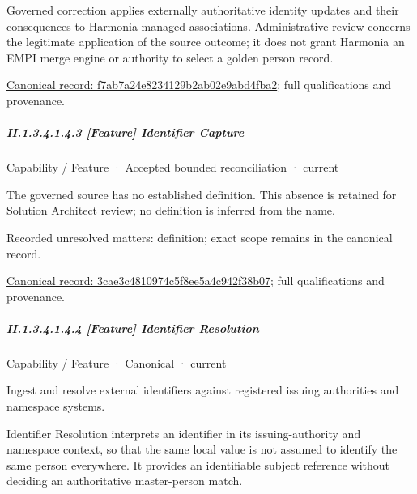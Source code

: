 Governed correction applies externally authoritative identity updates and their consequences to Harmonia-managed associations. Administrative review concerns the legitimate application of the source outcome; it does not grant Harmonia an EMPI merge engine or authority to select a golden person record.


{\footnotesize \href{../../../../continuum/strategy/capability/feature/f7ab7a24e8234129b2ab02e9abd4fba2.md}{Canonical record: f7ab7a24e8234129b2ab02e9abd4fba2}; full qualifications and provenance.}\par
\subparagraph*{II.1.3.4.1.4.3 [Feature] Identifier Capture}
\label{navigation:II.1.3.4.1.4.3}

\label{element:3cae3c4810974c5f8ee5a4c942f38b07}
{\small Capability / Feature · Accepted bounded reconciliation · current}\par

The governed source has no established definition. This absence is retained for Solution Architect review; no definition is inferred from the name.


{\small Recorded unresolved matters: definition; exact scope remains in the canonical record.}\par
{\footnotesize \href{../../../../continuum/strategy/capability/feature/3cae3c4810974c5f8ee5a4c942f38b07.md}{Canonical record: 3cae3c4810974c5f8ee5a4c942f38b07}; full qualifications and provenance.}\par
\subparagraph*{II.1.3.4.1.4.4 [Feature] Identifier Resolution}
\label{navigation:II.1.3.4.1.4.4}

\label{element:ae034169e1394ccdb3a2ce9651eaf305}
{\small Capability / Feature · Canonical · current}\par

Ingest and resolve external identifiers against registered issuing authorities and namespace systems.



Identifier Resolution interprets an identifier in its issuing-authority and namespace context, so that the same local value is not assumed to identify the same person everywhere. It provides an identifiable subject reference without deciding an authoritative master-person match.


